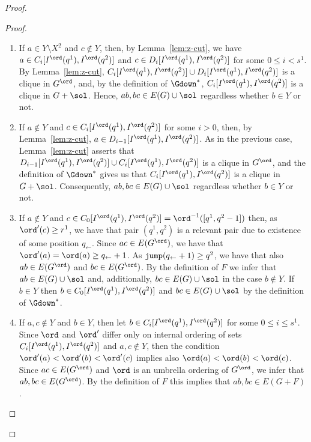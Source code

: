 \begin{proof}
\begin{proof}
\begin{enumerate}
\item If $a \in Y \setminus X^2$ and $c \notin Y$, then, by Lemma~\ref{lem:z-cut}, we have $a \in C_i[I^\ord(q^1),I^\ord(q^2)]$
and $c \in D_i[I^\ord(q^1),I^\ord(q^2)]$ for some $0  \leq i < s^1$. By Lemma~\ref{lem:z-cut},
$C_i[I^\ord(q^1),I^\ord(q^2)] \cup D_i[I^\ord(q^1),I^\ord(q^2)]$ is a clique in $G^\ord$, and, by the definition of $\Gdown^\ast$,
$C_i[I^\ord(q^1),I^\ord(q^2)]$ is a clique in $G+\sol$. Hence, $ab,bc \in E(G) \cup \sol$ regardless whether $b\in Y$ or not.
\item If $a \notin Y$ and $c \in C_i[I^\ord(q^1),I^\ord(q^2)]$ for some $i > 0$, then, by Lemma~\ref{lem:z-cut},
  $a \in D_{i-1}[I^\ord(q^1),I^\ord(q^2)]$. As in the previous case, Lemma~\ref{lem:z-cut} asserts that 
$D_{i-1}[I^\ord(q^1),I^\ord(q^2)] \cup C_i[I^\ord(q^1),I^\ord(q^2)]$ is a clique in $G^\ord$, and the definition of $\Gdown^\ast$
gives us that $C_i[I^\ord(q^1),I^\ord(q^2)]$ is a clique in $G+\sol$. Consequently, $ab,bc \in E(G) \cup \sol$  regardless whether $b\in Y$ or not.
\item If $a \notin Y$ and $c \in C_0[I^\ord(q^1),I^\ord(q^2)] = \ord^{-1}([q^1,q^2-1])$ then, as $\ord'(c) \geq r^1$, we have that pair $(q^1,q^2)$ is 
a relevant pair due to existence of some position $q_\leftarrow$. Since $ac\in E(G^\ord)$, we have that $\ord'(a) = \ord(a) \geq q_\leftarrow+1$.
As $\mathtt{jump}(q_\leftarrow+1) \geq q^2$, we have that also $ab\in E(G^\ord)$ and $bc\in E(G^\ord)$. By the definition of $F$ we infer that $ab \in E(G)\cup \sol$ and, additionally, $bc \in E(G) \cup \sol$ in the case $b \notin Y$.
If $b \in Y$ then $b \in C_0[I^\ord(q^1),I^\ord(q^2)]$ and $bc \in E(G) \cup \sol$ by the definition of $\Gdown^\ast$.
\item If $a,c \notin Y$ and $b \in Y$, then let $b \in C_i[I^\ord(q^1),I^\ord(q^2)]$ for some
$0 \leq i \leq s^1$. Since $\ord$ and $\ord'$ differ only on internal ordering of sets $C_i[I^\ord(q^1),I^\ord(q^2)]$ and $a,c\notin Y$, then the condition $\ord'(a) < \ord'(b) < \ord'(c)$ implies also $\ord(a) < \ord(b) < \ord(c)$. Since $ac\in E(G^\ord)$ and $\ord$ is an umbrella ordering of $G^\ord$, we infer that $ab,bc\in E(G^\ord)$. By the definition of $F$ this implies that $ab,bc\in E(G+F)$.
\end{enumerate}
\cqed\end{proof}


\end{proof}
